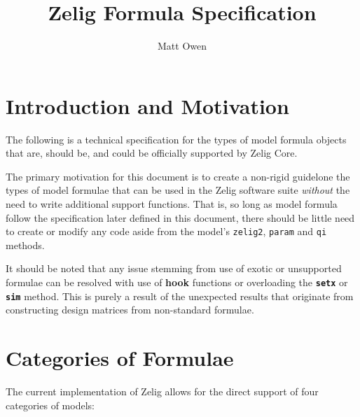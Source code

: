 \documentclass{article}
\title{Zelig Formula Specification}
\author{Matt Owen}
\begin{document}
\maketitle



%
%
%
\section{Introduction and Motivation}
\label{sec:intro}

The following is a technical specification for the types of model formula
objects that are, should be, and could be officially supported by Zelig Core.

The primary motivation for this document is to create a non-rigid guidelone the
types of model formulae that can be used in the Zelig software suite
\emph{without} the need to write additional support functions. That is, so long
as model formula follow the specification later defined in this document, there
should be little need to create or modify any code aside from the model's
{\tt zelig2}, {\tt param} and {\tt qi} methods.

It should be noted that any issue stemming from use of exotic or unsupported
formulae can be resolved with use of {\bf hook} functions or overloading the
{\bf \tt setx} or {\bf \tt sim} method. This is purely a result of the
unexpected results that originate from constructing design matrices from
non-standard formulae.



%
%
%
\section{Categories of Formulae}
\label{sec:req}

The current implementation of Zelig allows for the direct support of four
categories of models:
\end{document}
